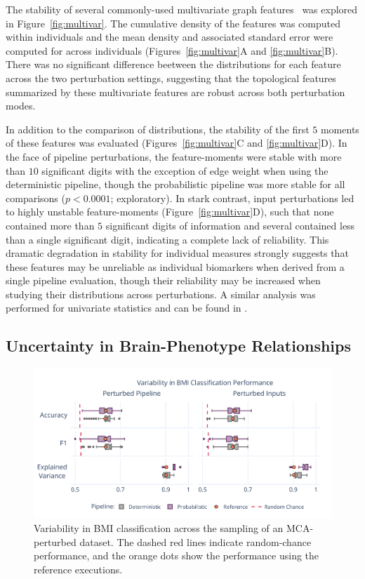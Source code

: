 \documentclass[fleqn,10pt]{SelfArx} %
\begin{document}
The stability of several commonly-used multivariate graph features~\cite{Betzel2018-eo} was explored in
Figure~\ref{fig:multivar}. The cumulative density of the features was computed within individuals and the mean
density and associated standard error were computed for across individuals (Figures~\ref{fig:multivar}A and
\ref{fig:multivar}B). There was no significant difference beetween the distributions for each feature across the two
perturbation settings, suggesting that the topological features summarized by these multivariate features are robust
across both perturbation modes.

In addition to the comparison of distributions, the stability of the first $5$ moments of these features was evaluated
(Figures~\ref{fig:multivar}C and \ref{fig:multivar}D). In the face of pipeline perturbations, the feature-moments were
stable with more than $10$ significant digits with the exception of edge weight when using the deterministic pipeline,
though the probabilistic pipeline was more stable for all comparisons ($p < 0.0001$; exploratory). In stark contrast,
input perturbations led to highly unstable feature-moments (Figure~\ref{fig:multivar}D), such that none contained more
than $5$ significant digits of information and several contained less than a single significant digit, indicating a
complete lack of reliability. This dramatic degradation in stability for individual measures strongly suggests that
these features may be unreliable as individual biomarkers when derived from a single pipeline evaluation, though their
reliability may be increased when studying their distributions across perturbations. A similar analysis was performed
for univariate statistics and can be found in .

\subsection*{Uncertainty in Brain-Phenotype Relationships}

\begin{figure}[ht]\centering
\includegraphics[width=0.7\linewidth]{figures/fig3_bmi_classification.pdf}
\caption{Variability in BMI classification across the sampling of an MCA-perturbed dataset. The dashed red lines
indicate random-chance performance, and the orange dots show the performance using the reference executions.}
\label{fig:bmi}
\end{figure}
 
\end{document}
